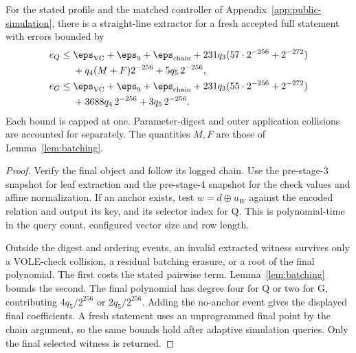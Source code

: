 \begin{theorem}\label{thm:concrete-wse}
For the stated profile and the matched controller of Appendix~\ref{app:public-simulation}, there is a straight-line extractor for a fresh accepted full statement with errors bounded by
\begin{align*}
 e_Q\le{}&\eps_{\rm VC}+\eps_9+\eps_{\rm chain}
 +231q_3(57\cdot2^{-256}+2^{-272})\\
 &+q_4(M+F)2^{-256}+5q_5\,2^{-256},\\
 e_G\le{}&\eps_{\rm VC}+\eps_9+\eps_{\rm chain}
 +231q_3(55\cdot2^{-256}+2^{-272})\\
 &+3688q_4\,2^{-256}+3q_5\,2^{-256}.
\end{align*}
Each bound is capped at one. Parameter-digest and outer application collisions are accounted for separately. The quantities $M,F$ are those of Lemma~\ref{lem:batching}.
\end{theorem}
\begin{proof}
Verify the final object and follow its logged chain. Use the pre-stage-3 snapshot for leaf extraction and the pre-stage-4 snapshot for the check values and affine normalization. If an anchor exists, test $w=d\oplus u_W$ against the encoded relation and output its key, and its selector index for Q. This is polynomial-time in the query count, configured vector size and row length.

Outside the digest and ordering events, an invalid extracted witness survives only a VOLE-check collision, a residual batching erasure, or a root of the final polynomial. The first costs the stated pairwise term. Lemma~\ref{lem:batching} bounds the second. The final polynomial has degree four for Q or two for G, contributing $4q_5/2^{256}$ or $2q_5/2^{256}$. Adding the no-anchor event gives the displayed final coefficients. A fresh statement uses an unprogrammed final point by the chain argument, so the same bounds hold after adaptive simulation queries. Only the final selected witness is returned.
\end{proof}


